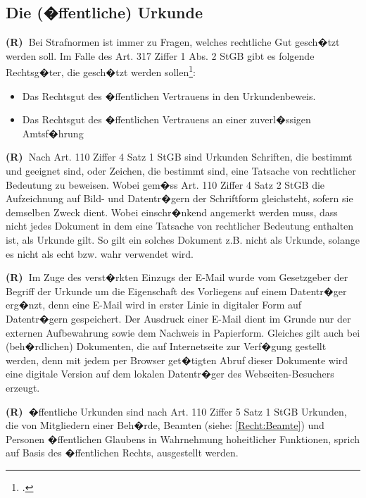 \documentclass[paper=a4,fontsize=12pt, oneside, numbers=noenddot]{scrbook}
\newcounter{rz}
\newcommand{\Rz}{\addtocounter{rz}{1}\textbf{(R\arabic{rz})~}}
\begin{document}
	
	
	\subsection{Die (�ffentliche) Urkunde}
	\Rz Bei Strafnormen ist immer zu Fragen, welches rechtliche Gut gesch�tzt werden soll. Im Falle des Art. 317 Ziffer 1 Abs. 2 StGB gibt es folgende Rechtsg�ter, die gesch�tzt werden sollen\footcite[Art. 317, Rz. 1]{2020:Wohlers:StGBHandkommentar}:
	
	\begin{itemize}[noitemsep]\setlength\itemsep{0.3em}
		\item Das Rechtsgut des �ffentlichen Vertrauens in den Urkundenbeweis.
		\item Das Rechtsgut des �ffentlichen Vertrauens an einer zuverl�ssigen Amtsf�hrung
	\end{itemize} 
	
	\Rz Nach Art. 110 Ziffer 4 Satz 1 StGB sind Urkunden Schriften, die bestimmt und geeignet sind, oder Zeichen, die bestimmt sind, eine Tatsache von rechtlicher Bedeutung zu beweisen. Wobei  gem�ss Art. 110 Ziffer 4 Satz 2 StGB die Aufzeichnung auf Bild- und Datentr�gern der Schriftform gleichsteht, sofern sie demselben Zweck dient. Wobei einschr�nkend angemerkt werden muss, dass nicht jedes Dokument in dem eine Tatsache von rechtlicher Bedeutung enthalten ist, als Urkunde gilt. So gilt ein solches Dokument z.B. nicht als Urkunde, solange es nicht als echt bzw. wahr verwendet wird. 
	
	\Rz Im Zuge des verst�rkten Einzugs der E-Mail wurde vom Gesetzgeber der Begriff der Urkunde um die Eigenschaft des Vorliegens auf einem Datentr�ger erg�nzt, denn eine E-Mail wird in erster Linie in digitaler Form auf Datentr�gern gespeichert. Der Ausdruck einer E-Mail dient im Grunde nur der externen Aufbewahrung sowie dem Nachweis in Papierform. Gleiches gilt auch bei (beh�rdlichen) Dokumenten, die auf Internetseite zur Verf�gung gestellt werden, denn mit jedem per Browser get�tigten Abruf dieser Dokumente wird eine digitale Version auf dem lokalen Datentr�ger des Webseiten-Besuchers erzeugt. 
	
	\Rz �ffentliche Urkunden sind nach Art. 110 Ziffer 5 Satz 1 StGB  Urkunden, die von Mitgliedern einer Beh�rde, Beamten (siehe: \ref{Recht:Beamte})  und Personen �ffentlichen Glaubens in Wahrnehmung hoheitlicher Funktionen, sprich auf Basis des �ffentlichen Rechts, ausgestellt werden. 
	
\end{document}
